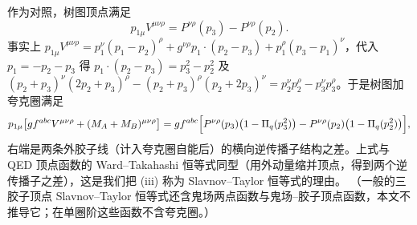 \documentclass[UTF8,a4paper,11pt,fontset=fandol]{ctexart}
\theoremstyle{cplain}
\theoremstyle{cdefinition}
\theoremstyle{cremark}
\numberwithin{equation}{section}
\begin{document}
作为对照，树图顶点满足
\begin{equation}\label{eq:tri-tree-ward}
p_{1\mu}V^{\mu\nu\rho}=P^{\nu\rho}(p_3)-P^{\nu\rho}(p_2).
\end{equation}
事实上 $p_{1\mu}V^{\mu\nu\rho}=p_1^\nu(p_1-p_2)^\rho+g^{\nu\rho}p_1\cdot(p_2-p_3)+p_1^\rho(p_3-p_1)^\nu$，代入 $p_1=-p_2-p_3$ 得 $p_1\cdot(p_2-p_3)=p_3^2-p_2^2$ 及
$(p_2+p_3)^\nu(2p_2+p_3)^\rho-(p_2+p_3)^\rho(p_2+2p_3)^\nu=p_2^\nu p_2^\rho-p_3^\nu p_3^\rho$。于是树图加夸克圈满足
\begin{equation*}
p_{1\mu}\bigl[g f^{abc}V^{\mu\nu\rho}+(M_A+M_B)^{\mu\nu\rho}\bigr]
=g f^{abc}\Bigl[P^{\nu\rho}(p_3)\bigl(1-\Pi_q(p_3^2)\bigr)-P^{\nu\rho}(p_2)\bigl(1-\Pi_q(p_2^2)\bigr)\Bigr],
\end{equation*}
右端是两条外胶子线（计入夸克圈自能后）的横向逆传播子结构之差。上式与 QED 顶点函数的 Ward--Takahashi 恒等式同型（用外动量缩并顶点，得到两个逆传播子之差），这是我们把 (iii) 称为 Slavnov--Taylor 恒等式的理由。
（一般的三胶子顶点 Slavnov--Taylor 恒等式还含鬼场两点函数与鬼场--胶子顶点函数，本文不推导它；在单圈阶这些函数不含夸克圈。）
\end{document}
